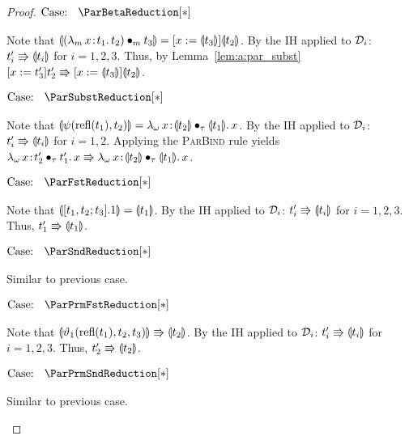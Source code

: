 \begin{proof}
    $\text{Case: }\begin{array}{c} \ParBetaReduction[*] \end{array}$
    \begin{proofcase}
        Note that $\llparenthesis {({\lambda_m}\, x\! : \! t_1.\, t_2) \bullet_{m} t_3} \rrparenthesis = [x := \llparenthesis {t_3} \rrparenthesis]\llparenthesis {t_2} \rrparenthesis$.
        By the IH applied to $\mathcal{D}_{i}$: $t_i^\prime \Rrightarrow \llparenthesis {t_i} \rrparenthesis$ for $i = 1, 2, 3$.
        Thus, by Lemma~\ref{lem:a:par_subst} $[x := t_3^\prime]t_2^\prime \Rrightarrow [x := \llparenthesis {t_3} \rrparenthesis]\llparenthesis {t_2} \rrparenthesis$.
    \end{proofcase}

    $\text{Case: }\begin{array}{c} \ParSubstReduction[*] \end{array}$
    \begin{proofcase}
        Note that $\llparenthesis {\psi(\text{refl}(t_1), t_2)} \rrparenthesis = {\lambda_\omega}\, x\! : \! \llparenthesis {t_2} \rrparenthesis \bullet_{\tau} \llparenthesis {t_1} \rrparenthesis.\, x$.
        By the IH applied to $\mathcal{D}_{i}$: $t_i^\prime \Rrightarrow \llparenthesis {t_i} \rrparenthesis$ for $i = 1, 2$.
        Applying the \textsc{ParBind} rule yields ${\lambda_\omega}\, x\! : \! t_2^\prime \bullet_{\tau} t_1^\prime.\, x \Rrightarrow {\lambda_\omega}\, x\! : \! \llparenthesis {t_2} \rrparenthesis \bullet_{\tau} \llparenthesis {t_1} \rrparenthesis.\, x$.
    \end{proofcase}

    $\text{Case: }\begin{array}{c} \ParFstReduction[*] \end{array}$
    \begin{proofcase}
        Note that $\llparenthesis {[t_1, t_2; t_3].1} \rrparenthesis = \llparenthesis {t_1} \rrparenthesis$.
        By the IH applied to $\mathcal{D}_{i}$: $t_i^\prime \Rrightarrow \llparenthesis {t_i} \rrparenthesis$ for $i = 1, 2, 3$.
        Thus, $t_1^\prime \Rrightarrow \llparenthesis {t_1} \rrparenthesis$.
    \end{proofcase}

    $\text{Case: }\begin{array}{c} \ParSndReduction[*] \end{array}$
    \begin{proofcase}
        Similar to previous case.
    \end{proofcase}

    $\text{Case: }\begin{array}{c} \ParPrmFstReduction[*] \end{array}$
    \begin{proofcase}
        Note that $\llparenthesis {\vartheta_1(\text{refl}(t_1), t_2, t_3)} \rrparenthesis \Rrightarrow \llparenthesis {t_2} \rrparenthesis$.
        By the IH applied to $\mathcal{D}_{i}$: $t_i^\prime \Rrightarrow \llparenthesis {t_i} \rrparenthesis$ for $i = 1, 2, 3$.
        Thus, $t_2^\prime \Rrightarrow \llparenthesis {t_2} \rrparenthesis$.
    \end{proofcase}

    $\text{Case: }\begin{array}{c} \ParPrmSndReduction[*] \end{array}$
    \begin{proofcase}
        Similar to previous case.
    \end{proofcase}
\end{proof}

